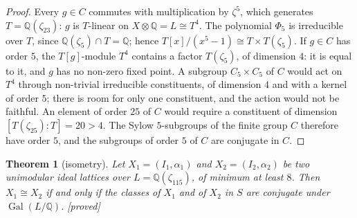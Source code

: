 \documentclass[11pt,a4paper]{amsart}
\theoremstyle{plain}
\newtheorem{theorem}{Theorem}[section]
\theoremstyle{definition}
\numberwithin{equation}{section}
\newcommand{\Q}{\mathbb{Q}}
\DeclareMathOperator{\Gal}{Gal}
\newcommand{\st}[1]{\textup{\textsf{\small[#1]}}}
\newcommand{\DEM}{\st{proved}}
\begin{document}
\begin{proof}
Every $g\in C$ commutes with multiplication by $\zeta^5$, which generates $T=\Q(\zeta_{23})$: $g$ is $T$-linear on $X\otimes\Q=L\cong T^4$. The polynomial $\Phi_5$ is irreducible over $T$, since $\Q(\zeta_5)\cap T=\Q$; hence $T[x]/(x^5-1)\cong T\times T(\zeta_5)$. If $g\in C$ has order $5$, the $T[g]$-module $T^4$ contains a factor $T(\zeta_5)$, of dimension $4$: it is equal to it, and $g$ has no non-zero fixed point. A subgroup $C_5\times C_5$ of $C$ would act on $T^4$ through non-trivial irreducible constituents, of dimension $4$ and with a kernel of order $5$; there is room for only one constituent, and the action would not be faithful. An element of order $25$ of $C$ would require a constituent of dimension $[T(\zeta_{25}):T]=20>4$. The Sylow $5$-subgroups of the finite group $C$ therefore have order $5$, and the subgroups of order $5$ of $C$ are conjugate in $C$.
\end{proof}

\begin{theorem}[isometry]\label{thm:isometrie}
Let $X_1=(I_1,\alpha_1)$ and $X_2=(I_2,\alpha_2)$ be two unimodular ideal lattices over $L=\Q(\zeta_{115})$, of minimum at least $8$. Then $X_1\cong X_2$ if and only if the classes of $X_1$ and of $X_2$ in $S$ are conjugate under $\Gal(L/\Q)$. \DEM
\end{theorem}
\end{document}
